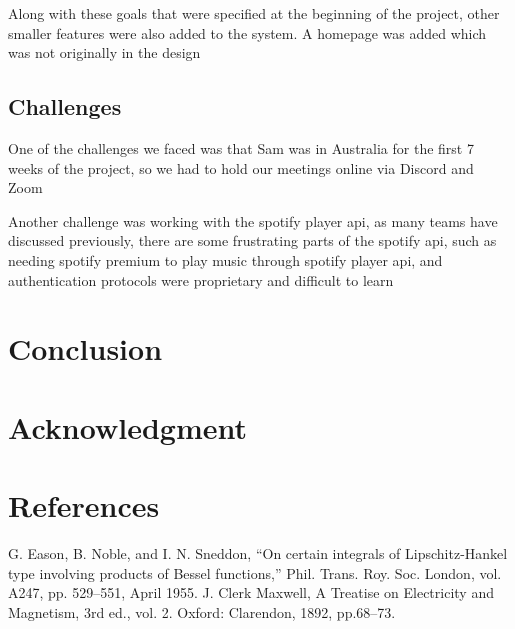 \documentclass[conference]{IEEEtran}
\begin{document}
Along with these goals that were specified at the beginning of the project, other smaller features were also added to the system. A homepage was added which was not originally in the design


\subsection{Challenges}
One of the challenges we faced was that Sam was in Australia for the first 7 weeks of the project, so we had to hold our meetings online via Discord and Zoom

Another challenge was working with the spotify player api, as many teams have discussed previously, there are some frustrating parts of the spotify api, such as needing spotify premium to play music through spotify player api, and authentication protocols were proprietary and difficult to learn


\section{Conclusion}


\section*{Acknowledgment}

\section*{References}


\begin{thebibliography}{00}
 G. Eason, B. Noble, and I. N. Sneddon, ``On certain integrals of Lipschitz-Hankel type involving products of Bessel functions,'' Phil. Trans. Roy. Soc. London, vol. A247, pp. 529--551, April 1955.
 J. Clerk Maxwell, A Treatise on Electricity and Magnetism, 3rd ed., vol. 2. Oxford: Clarendon, 1892, pp.68--73.
\end{thebibliography}
\end{document}
